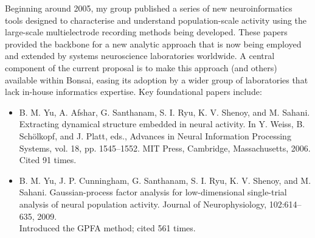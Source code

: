 {Beginning around 2005, my group published a series of new
neuroinformatics tools designed to characterise and understand
population-scale activity using the large-scale multielectrode
recording methods being developed.  These papers provided the backbone
for a new analytic approach that is now being employed and extended by
systems neuroscience laboratories worldwide.
%
A central component of the current proposal is to make this approach
(and others) available within Bonsai, easing its adoption by a wider
group of laboratories that lack in-house informatics expertise.
%
Key foundational papers include:
\begin{itemize}[topsep=0pt,itemsep=0pt]
\item  B. M. Yu, A. Afshar, G. Santhanam, S. I. Ryu, K. V. Shenoy, and M. Sahani.
Extracting dynamical structure embedded in neural activity.
In Y. Weiss, B. Schölkopf, and J. Platt, eds., Advances in Neural
Information Processing Systems, vol. 18, pp. 1545–1552. MIT Press,
Cambridge, Massachusetts, 2006.\\
Cited 91 times.
\item B. M. Yu, J. P. Cunningham, G. Santhanam, S. I. Ryu, K. V. Shenoy, and M. Sahani.
Gaussian-process factor analysis for low-dimensional single-trial analysis of neural population activity.
Journal of Neurophysiology, 102:614–635, 2009.\\
Introduced the GPFA method; cited 561 times.



\end{itemize}}
